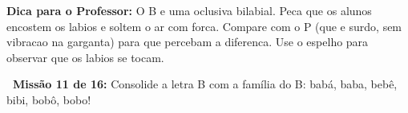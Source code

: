\begin{dica}
\textbf{Dica para o Professor:} O B e uma oclusiva bilabial. Peca que os alunos encostem os labios e soltem o ar com forca. Compare com o P (que e surdo, sem vibracao na garganta) para que percebam a diferenca. Use o espelho para observar que os labios se tocam.
\end{dica}





\begin{missao}
\textbf{\faGamepad~Miss\~a{}o 11 de 16:} Consolide a letra B com a fam\'ilia do B: bab\'a, baba, beb\^e, bibi, bob\^o, bobo!
\end{missao}

